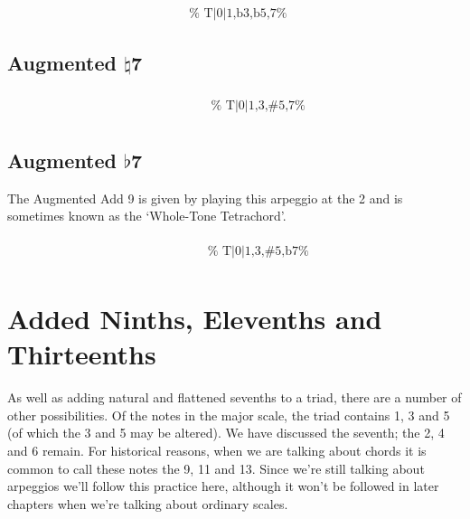 \documentclass[english]{./gbook}
\begin{document}
\begin{large}
\[\begin{array}{ll}
&
	\text{
	}
\end{array}
\]


\subsection*{Augmented $\natural$7}

\[
\begin{array}{ll}
	\begin{array}{c}
		\begin{array}{ccc}
			&%
			&%
		\end{array}
		\\
		\begin{array}{cc}
			&%
		\end{array}
	\end{array}

&
	\text{
	}
\end{array}
\]


\subsection*{Augmented $\flat$7}

The Augmented Add 9 is given by playing this arpeggio at the 2 and is sometimes known as the `Whole-Tone Tetrachord'.

\[
\begin{array}{ll}
	\begin{array}{c}
		\begin{array}{ccc}
			&%
			&%
		\end{array}
		\\
		\begin{array}{cc}
			&%
		\end{array}
	\end{array}

&
	\text{
	}
\end{array}
\]


\section{Added Ninths, Elevenths and Thirteenths}

As well as adding natural and flattened sevenths to a triad, there are a number of other possibilities. Of the notes in the major scale, the triad contains 1, 3 and 5 (of which the 3 and 5 may be altered). We have discussed the seventh; the 2, 4 and 6 remain. For historical reasons, when we are talking about chords it is common to call these notes the 9, 11 and 13. Since we're still talking about arpeggios we'll follow this practice here, although it won't be followed in later chapters when we're talking about ordinary scales.


\end{large}
\end{document}
